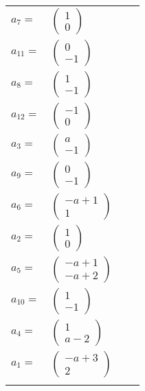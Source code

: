 \documentclass[1p]{elsarticle_modified}
\theoremstyle{definition}
\begin{document}
\begin{tabular}{m{7pt} m{180pt} m{7pt} m{180pt} }
\flushright $a_{7}=$&$\begin{pmatrix}1\\0\end{pmatrix}$ \\
\flushright $a_{11}=$&$\begin{pmatrix}0\\-1\end{pmatrix}$ \\
\flushright $a_{8}=$&$\begin{pmatrix}1\\-1\end{pmatrix}$ \\
\flushright $a_{12}=$&$\begin{pmatrix}-1\\0\end{pmatrix}$ \\
\flushright $a_{3}=$&$\begin{pmatrix}a\\-1\end{pmatrix}$ \\
\flushright $a_{9}=$&$\begin{pmatrix}0\\-1\end{pmatrix}$ \\
\flushright $a_{6}=$&$\begin{pmatrix}- a+1\\1\end{pmatrix}$ \\
\flushright $a_{2}=$&$\begin{pmatrix}1\\0\end{pmatrix}$ \\
\flushright $a_{5}=$&$\begin{pmatrix}- a+1\\- a+2\end{pmatrix}$ \\
\flushright $a_{10}=$&$\begin{pmatrix}1\\-1\end{pmatrix}$ \\
\flushright $a_{4}=$&$\begin{pmatrix}1\\a-2\end{pmatrix}$ \\
\flushright $a_{1}=$&$\begin{pmatrix}- a+3\\2\end{pmatrix}$\\&\end{tabular}
\end{document}
